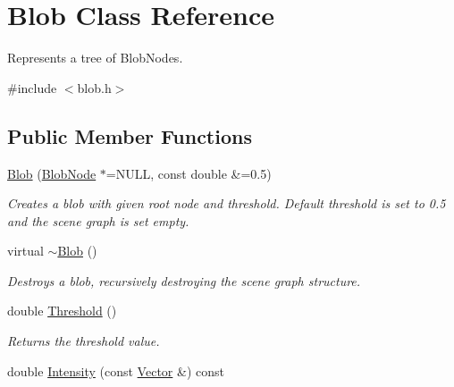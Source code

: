 \hypertarget{class_blob}{
\section{Blob Class Reference}
\label{class_blob}
}


Represents a tree of BlobNodes.  




{\ttfamily \#include $<$blob.h$>$}

\subsection*{Public Member Functions}
\begin{DoxyCompactItemize}
\item 
\hyperlink{class_blob_a303a20157a5ed6e219303d0265d78042}{Blob} (\hyperlink{class_blob_node}{BlobNode} $\ast$=NULL, const double \&=0.5)
\begin{DoxyCompactList}\small\item\em Creates a blob with given root node and threshold. Default threshold is set to 0.5 and the scene graph is set empty. \item\end{DoxyCompactList}\item 
\hypertarget{class_blob_a8a8d34c9112cb907fdffcb5dbd2dd244}{
virtual \hyperlink{class_blob_a8a8d34c9112cb907fdffcb5dbd2dd244}{$\sim$Blob} ()}
\label{class_blob_a8a8d34c9112cb907fdffcb5dbd2dd244}

\begin{DoxyCompactList}\small\item\em Destroys a blob, recursively destroying the scene graph structure. \item\end{DoxyCompactList}\item 
\hypertarget{class_blob_a81e13f50238e9d6d882e4db2c99c112a}{
double \hyperlink{class_blob_a81e13f50238e9d6d882e4db2c99c112a}{Threshold} ()}
\label{class_blob_a81e13f50238e9d6d882e4db2c99c112a}

\begin{DoxyCompactList}\small\item\em Returns the threshold value. \item\end{DoxyCompactList}\item 
\hypertarget{class_blob_af27b7a8bcfc5aa22fe1d253c0717075f}{
double \hyperlink{class_blob_af27b7a8bcfc5aa22fe1d253c0717075f}{Intensity} (const \hyperlink{class_vector}{Vector} \&) const }
\label{class_blob_af27b7a8bcfc5aa22fe1d253c0717075f}


\end{DoxyCompactItemize}

